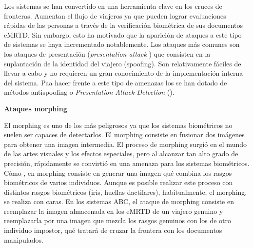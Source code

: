 
Los sistemas  se han convertido en una herramienta clave en los cruces de fronteras. Aumentan el flujo de viajeros ya que pueden lograr evaluaciones rápidas de las personas a través de la verificación biométrica de sus documentos \gls{eMRTD}. Sin embargo, esto ha motivado que la aparición de ataques a este tipo de sistemas se haya incrementado notablemente. Los ataques más comunes son los ataques de presentación (\textit{presentation attack} ) que consisten en la suplantación de la identidad del viajero (\gls{spoofing}). Son relativamente fáciles de llevar a cabo y no requieren un gran conocimiento de la implementación interna del sistema. Paa hacer frente a este tipo de amenazas los  se han dotado de métodos \gls{antispoofing} o \textit{Presentation Attack Detection} ().


\medskip
\textbf{Ataques \Gls{morphing}} 
\medskip

El \gls{morphing} es uno de los  más peligrosos ya que los sistemas biométricos no suelen ser capaces de detectarlos. El \gls{morphing} consiste en fusionar dos imágenes para obtener una imagen intermedia. El proceso de morphing surgió en el mundo de las artes visuales y los efectos especiales, pero al alcanzar tan alto grado de precisión, rápidamente se convirtió en una amenaza para los sistemas biométricos. Cómo , en \gls{morphing} consiste en generar una imagen qué combina los rasgos biométricos de varios individuos. Aunque es posible realizar este proceso con distintos rasgos biométricos (iris, huellas dactilares), habitualmente, el \gls{morphing}, se realiza con caras. En los sistemas \gls{ABC}, el ataque de morphing consiste en reemplazar la imagen almacenada en los \gls{eMRTD} de un viajero genuino y reemplazarla por una imagen que mezcla los rasgos genuinos con los de otro individuo impostor, qué tratará de cruzar la frontera con los documentos manipulados.

